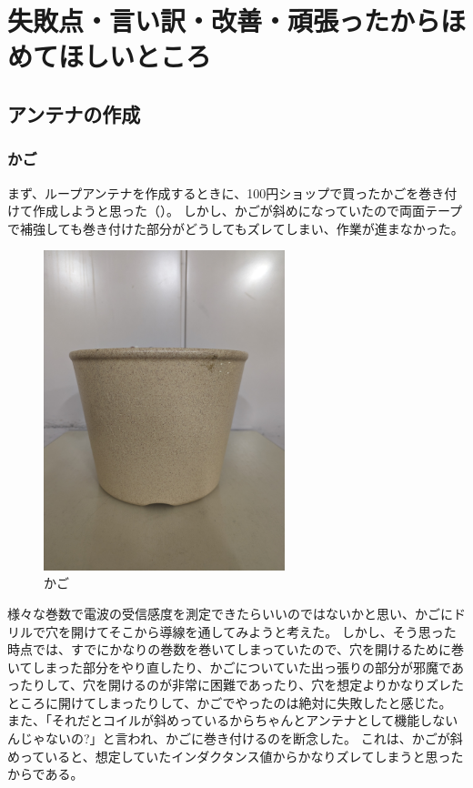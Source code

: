 \documentclass[report.tex]{subfiles}
\begin{document}
\section{失敗点・言い訳・改善・頑張ったからほめてほしいところ}

\subsection{アンテナの作成}

\subsubsection{かご}

まず、ループアンテナを作成するときに、100円ショップで買ったかごを巻き付けて作成しようと思った（）。
しかし、かごが斜めになっていたので両面テープで補強しても巻き付けた部分がどうしてもズレてしまい、作業が進まなかった。

\begin{figure}[H]
	\centering
	\includegraphics[width=7cm]{use/kago.jpg}
	\caption{かご}
	\label{fig:kago}
\end{figure}

様々な巻数で電波の受信感度を測定できたらいいのではないかと思い、かごにドリルで穴を開けてそこから導線を通してみようと考えた。
しかし、そう思った時点では、すでにかなりの巻数を巻いてしまっていたので、穴を開けるために巻いてしまった部分をやり直したり、かごについていた出っ張りの部分が邪魔であったりして、穴を開けるのが非常に困難であったり、穴を想定よりかなりズレたところに開けてしまったりして、かごでやったのは絶対に失敗したと感じた。
また、「それだとコイルが斜めっているからちゃんとアンテナとして機能しないんじゃないの?」と言われ、かごに巻き付けるのを断念した。
これは、かごが斜めっていると、想定していたインダクタンス値からかなりズレてしまうと思ったからである。
\end{document}
